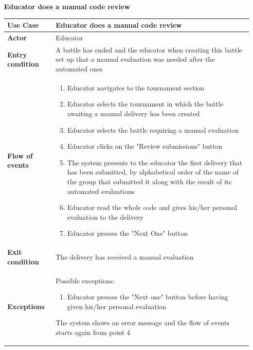 \documentclass[../RASD.tex]{subfiles}
\begin{document}
        \textbf{Educator does a manual code review}
        \begin{table}[h!]
            \begin{center}
                \begin{tabular}{|m{10em}|m{30em}|}
                \hline
                \textbf{Use Case} & Educator does a manual code review\\
                \hline
                \textbf{Actor} & Educator\\
                \hline
                \textbf{Entry condition} & A battle has ended and the educator when creating this battle set up that a manual evaluation was needed after the automated ones\\
                \hline
                \textbf{Flow of events} & 
                    \begin{enumerate}
                        \item Educator navigates to the tournament section
                        \item Educator selects the tournament in which the battle awaiting a manual delivery has been created
                        \item Educator selects the battle requiring a manual evaluation
                        \item Educator clicks on the "Review submissions" button
                        \item The system presents to the educator the first delivery that has been submitted, by alphabetical order of the name of the group that submitted it along with the result of its automated evaluations
                        \item Educator read the whole code and gives his/her personal evaluation to the delivery
                        \item Educator presses the "Next One" button
                    \end{enumerate}\\
                \hline
                \textbf{Exit condition} & 
                    The delivery has received a manual evaluation\\
                \hline
                \textbf{Exceptions} & 
                    Possible exceptions:
                    \begin{enumerate}
                        \item Educator presses the "Next one" button before having given his/her personal evaluation
                    \end{enumerate}
                    The system shows an error message and the flow of events starts again from point 4\\
                \hline
                \end{tabular}
            \end{center}
        \end{table}\newpage
\end{document}
